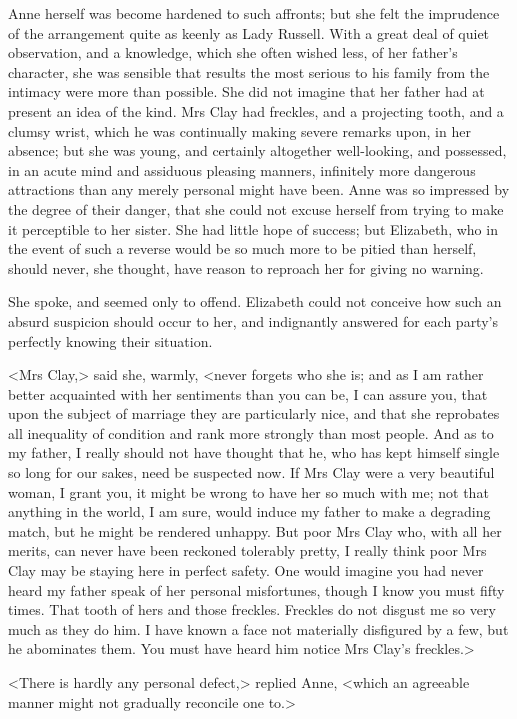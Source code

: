 Anne herself was become hardened to such affronts; but she felt the imprudence of the arrangement quite as keenly as Lady Russell. With a great deal of quiet observation, and a knowledge, which she often wished less, of her father's character, she was sensible that results the most serious to his family from the intimacy were more than possible. She did not imagine that her father had at present an idea of the kind. Mrs Clay had freckles, and a projecting tooth, and a clumsy wrist, which he was continually making severe remarks upon, in her absence; but she was young, and certainly altogether well-looking, and possessed, in an acute mind and assiduous pleasing manners, infinitely more dangerous attractions than any merely personal might have been. Anne was so impressed by the degree of their danger, that she could not excuse herself from trying to make it perceptible to her sister. She had little hope of success; but Elizabeth, who in the event of such a reverse would be so much more to be pitied than herself, should never, she thought, have reason to reproach her for giving no warning.

She spoke, and seemed only to offend. Elizabeth could not conceive how such an absurd suspicion should occur to her, and indignantly answered for each party's perfectly knowing their situation.

<Mrs Clay,> said she, warmly, <never forgets who she is; and as I am rather better acquainted with her sentiments than you can be, I can assure you, that upon the subject of marriage they are particularly nice, and that she reprobates all inequality of condition and rank more strongly than most people. And as to my father, I really should not have thought that he, who has kept himself single so long for our sakes, need be suspected now. If Mrs Clay were a very beautiful woman, I grant you, it might be wrong to have her so much with me; not that anything in the world, I am sure, would induce my father to make a degrading match, but he might be rendered unhappy. But poor Mrs Clay who, with all her merits, can never have been reckoned tolerably pretty, I really think poor Mrs Clay may be staying here in perfect safety. One would imagine you had never heard my father speak of her personal misfortunes, though I know you must fifty times. That tooth of hers and those freckles. Freckles do not disgust me so very much as they do him. I have known a face not materially disfigured by a few, but he abominates them. You must have heard him notice Mrs Clay's freckles.>

<There is hardly any personal defect,> replied Anne, <which an agreeable manner might not gradually reconcile one to.>

